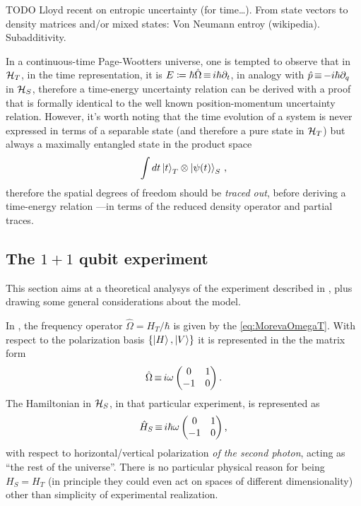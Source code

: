 TODO Lloyd recent on entropic uncertainty (for time\dots).
From state vectors to density matrices and/or mixed states: Von Neumann entroy (wikipedia).
Subadditivity. 
\fi

In a continuous-time Page-Wootters universe,
one is tempted to observe that in $\mathcal{H}_T$,
in the time representation, it is $E \coloneq \hbar\hat{\Omega} \operatorname*{\equiv} i\hbar\partial_{t}$,
in analogy with $\hat{p} \operatorname*{\equiv} -i\hbar\partial_{q}$ in $\mathcal{H}_S$,
therefore a time-energy uncertainty relation can be derived
with a proof that is formally identical to the well known
position-momentum uncertainty relation. However, it's worth
noting that the time evolution of a system is never expressed
in terms of a separable state (and therefore a pure state in $\mathcal{H}_T$)
but always a maximally entangled state in the product space
\begin{equation*}
  \int dt \ket{t}_T \otimes \ket{\psi(t)}_S \, \text{,}
\end{equation*}
therefore the spatial degrees of freedom should be \emph{traced out},
before deriving a time-energy relation 
---in terms of the reduced density operator and partial traces.

\subsection{The $1 + 1$ qubit experiment}\label{1qubitExp}

This section aims at a theoretical analysys of the experiment
described in \cite{Moreva:synthetic, Moreva:illustration},
plus drawing some general considerations about the model. 

In \cite{Moreva:illustration}, the frequency operator $\hat{\Omega} = H_T / \hbar$
is given by the \eqref{eq:MorevaOmegaT}. With respect to the polarization basis
$\qty{\ket{H}, \ket{V}}$ it is represented in the the matrix form
\begin{equation}
  \hat{\Omega} \operatorname*{\equiv} {
    i\omega
    \begin{pmatrix}
      0 & 1 \\
     -1 & 0
    \end{pmatrix}
  } \, \text{.}
\end{equation}
The Hamiltonian in $\mathcal{H}_S$, in that particular experiment, is represented as
\begin{equation}\label{eq:H_S}
  \hat{H}_S \operatorname*{\equiv} {
    i\hbar\omega
    \begin{pmatrix}
      0 & 1 \\
     -1 & 0
    \end{pmatrix}
  } \, \text{,}
\end{equation}
with respect to horizontal/vertical polarization \emph{of the second photon},
acting as ``the rest of the universe''.
There is no particular physical reason for being $H_S = H_T$
(in principle they could even act on spaces of different dimensionality)
other than simplicity of experimental realization.


